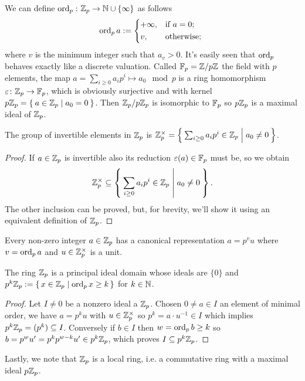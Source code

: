 		We can define $\textrm{ord}_p\,\colon \mathbb{Z}_p \to \mathbb{N} \cup \{\infty\}$ as follows
		\begin{equation*}
			\ord a := 
			\begin{cases*}
				+\infty, & if $a = 0$; \\
				v, & otherwise;
			\end{cases*}
		\end{equation*}
		where $v$ is the minimum integer such that $a_v > 0$. It's easily seen that $\textrm{ord}_p\,$ behaves exactly like a discrete valuation.\newline
		Called $\mathbb{F}_p = \mathbb{Z}/p\mathbb{Z}$ the field with $p$ elements, the map $a = \sum_{i \geq0}a_ip^i \mapsto a_0 \mod p$ is a ring homomorphism $\varepsilon\colon \mathbb{Z}_p \to \mathbb{F}_p$, which is obviously surjective and with kernel $p\mathbb{Z}_p = \Set{a\in   \mathbb{Z} _p | a_0 = 0}$. Then $\mathbb{Z}_p/p\mathbb{Z}_p$ is isomorphic to $\mathbb{F}_p$ so $p\mathbb{Z}_p$ is a maximal ideal of $\mathbb{Z}_p$.
		\begin{prop}
			The group of invertible elements in $\mathbb{Z}_p$ is $\mathbb{Z}_p^{\times} = \Set{\sum_{i \geq 0}a_ip^i \in   \mathbb{Z} _p | a_0 \neq 0}$.
		\end{prop}
		\begin{proof}
			If $a \in \mathbb{Z}_p$ is invertible also its reduction $\varepsilon(a) \in \mathbb{F}_p$ must be, so we obtain
			\[
				\mathbb{Z}_p^{\times} \subseteq \Set{\sum_{i \geq 0}a_ip^i \in   \mathbb{Z} _p | a_0 \neq 0 }.
			\]
			The other inclusion can be proved, but, for brevity, we'll show it using an equivalent definition of $\mathbb{Z}_p$.
		\end{proof}
		\begin{corollary}
			Every non-zero \padic integer $a \in \mathbb{Z}_p$ has a canonical representation $a = p^vu$ where $v = \textrm{ord}_p\, a$ and $u \in \mathbb{Z}_p^{\times}$ is a \padic unit.
		\end{corollary}
		\begin{prop}
			The ring $\mathbb{Z}_p$ is a principal ideal domain whose ideals are $\{0\}$ and $p^k\mathbb{Z}_p := \set{x \in   \mathbb{Z} _p | \mathrm{ord}_p\, x \geq k}$ for $k \in \mathbb{N}$.
		\end{prop}
		\begin{proof}
			Let $I \neq 0$ be a nonzero ideal a $\mathbb{Z}_p$. Chosen $0 \neq a \in I$ an element of minimal order, we have $a = p^ku$ with $u \in \mathbb{Z}_p^{\times}$ so $p^k = a \cdot u^{-1} \in I$ which implies $p^k\mathbb{Z}_p = (p^k) \subseteq I$. Conversely if $b \in I$ then $w = \textrm{ord}_p\, b \geq k$ so $b = p^wu' = p^kp^{w-k}u' \in p^k\mathbb{Z}_p$, which proves $I \subseteq p^k\mathbb{Z}_p$.
		\end{proof}
		Lastly, we note that $\mathbb{Z}_p$ is a local ring, i.e. a commutative ring with a maximal ideal $p\mathbb{Z}_p$. 
